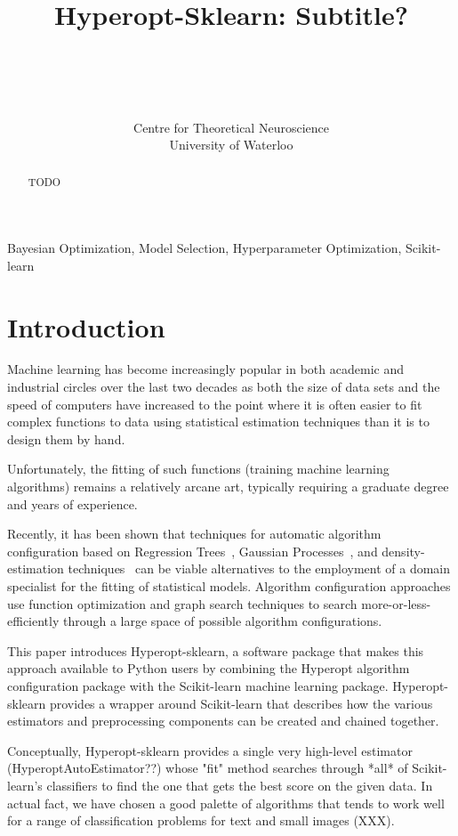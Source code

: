 \documentclass[wcp]{jmlr}
\title[Hyperopt-Sklearn]{Hyperopt-Sklearn: Subtitle?}
\author{
      \\
      \Name{Brent Komer} \Email{brent.komer@uwaterloo.ca}\\
      \Name{James Bergstra} \Email{james.bergstra@uwaterloo.ca}\\
      \Name{Chris Eliasmith} \Email{celiasmith@uwaterloo.ca}\\
      \addr Centre for Theoretical Neuroscience\\University of Waterloo\\
  }
\begin{document}
\maketitle

\begin{abstract}
    TODO
\end{abstract}
\begin{keywords}
Bayesian Optimization, Model Selection, Hyperparameter Optimization, Scikit-learn
\end{keywords}

\section{Introduction}
Machine learning has become increasingly popular in both academic and
industrial circles over the last two decades as both the size of data sets and
the speed of computers have increased to the point where it is often easier to
fit complex functions to data using statistical estimation techniques than it
is to design them by hand.

Unfortunately, the fitting of such functions (training machine learning
algorithms) remains a relatively arcane art, typically requiring a graduate
degree and years of experience.

Recently, it has been shown that techniques for automatic algorithm configuration based on
Regression Trees~\citep{hutter+hoos+leyton-brown:2011},
Gaussian Processes~\citep{Mockus78,snoek+larochelle+adams:2012nips},
and density-estimation techniques~\citep{bergstra+bardenet+bengio+kegl:2011} can be viable alternatives to the
employment of a domain specialist for the fitting of statistical models.
Algorithm configuration approaches use function optimization and graph search techniques
to search more-or-less-efficiently through a large space of possible algorithm
configurations.

This paper introduces Hyperopt-sklearn, a software package that makes this
approach available to Python users by combining the Hyperopt algorithm
configuration package with the Scikit-learn machine learning package.
Hyperopt-sklearn provides a wrapper around Scikit-learn that describes how the
various estimators and preprocessing components can be created and chained
together.

Conceptually, Hyperopt-sklearn provides a single very high-level
estimator (HyperoptAutoEstimator??) whose "fit" method searches through *all*
of Scikit-learn's classifiers to find the one that gets the best score on the
given data. In actual fact, we have chosen a good palette of algorithms
that tends to work well for a range of classification problems for text and
small images (XXX).
\end{document}
